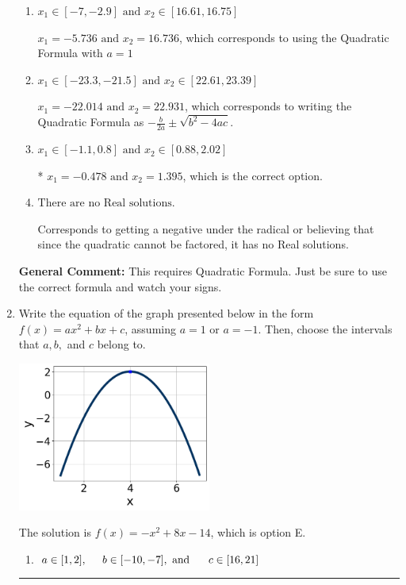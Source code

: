 \documentclass{extbook}[14pt]
\newcommand{\litem}[1]{\item #1

\rule{\textwidth}{0.4pt}}
\begin{document}
\begin{enumerate}
{\begin{enumerate}[label=\Alph*.]
 $x_1 = -1.395 \text{ and } x_2 = 0.478$, which corresponds to writing the Quadratic Formula as $\frac{b \pm \sqrt{b^2 - 4ac}}{2a}$
\item \( x_1 \in [-7, -2.9] \text{ and } x_2 \in [16.61, 16.75] \)

 $x_1 = -5.736 \text{ and } x_2 = 16.736$, which corresponds to using the Quadratic Formula with $a=1$
\item \( x_1 \in [-23.3, -21.5] \text{ and } x_2 \in [22.61, 23.39] \)

 $x_1 = -22.014 \text{ and } x_2 = 22.931$, which corresponds to writing the Quadratic Formula as $-\frac{b}{2a} \pm \sqrt{b^2 - 4ac}$.
\item \( x_1 \in [-1.1, 0.8] \text{ and } x_2 \in [0.88, 2.02] \)

* $x_1 = -0.478 \text{ and } x_2 = 1.395$, which is the correct option.
\item \( \text{There are no Real solutions.} \)

Corresponds to getting a negative under the radical or believing that since the quadratic cannot be factored, it has no Real solutions.
\end{enumerate}

\textbf{General Comment:} This requires Quadratic Formula. Just be sure to use the correct formula and watch your signs.
}
\litem{
Write the equation of the graph presented below in the form $f(x)=ax^2+bx+c$, assuming  $a=1$ or $a=-1$. Then, choose the intervals that $a, b,$ and $c$ belong to.

\begin{center}
    \includegraphics[width=0.5\textwidth]{../Figures/quadraticGraphToEquationCopyB.png}
\end{center}




The solution is \( f(x) = -x^{2} +8 x -14 \), which is option E.\begin{enumerate}[label=\Alph*.]
\item \( a \in [1, 2], \hspace*{5mm} b \in [-10, -7], \text{ and } \hspace*{5mm} c \in [16, 21] \)


\end{enumerate}}
\end{enumerate}
\end{document}
